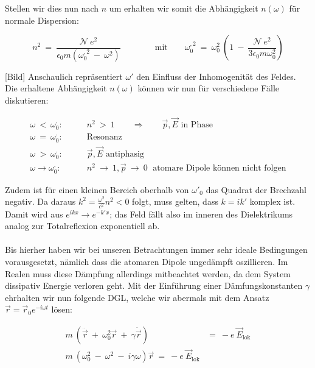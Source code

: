 Stellen wir dies nun nach $n$ um erhalten wir somit die Abhängigkeit $n(\omega)$ für normale Dispersion:

\begin{equation*}
n^2 \ = \ \frac{\mathcal{N} \ e^2}{\epsilon_0 m \left(\omega_0^{,2} \ - \ \omega^2\right)} \qquad \qquad \text{mit} \qquad \omega_0^{,2} \ = \ \omega_0^2\ \left(1 \ - \ \frac{\mathcal{N} \ e^2}{3 \epsilon_0 m \omega_0^2}\right)
\end{equation*}

[Bild]
Anschaulich repräsentiert $\omega'$ den Einfluss der Inhomogenität des Feldes. Die erhaltene Abhängigkeit $n(\omega)$ können wir nun für verschiedene Fälle diskutieren:

\begin{align*}
\omega \ < \ \omega^{,}_0:& \qquad n^2 \ > \ 1 \qquad \Rightarrow\qquad \vec{p},\vec{E} \text{ in Phase}\\
\omega \ = \ \omega^{,}_0:& \qquad \text{Resonanz}\\
\omega \ > \ \omega^{,}_0:& \qquad \vec{p},\vec{E} \text{ antiphasig}\\
\omega \rightarrow \omega^{,}_0:& \qquad n^2 \ \rightarrow \ 1, \vec{p} \ \rightarrow \ 0 \; \text{ atomare Dipole können nicht  folgen}
\end{align*}

Zudem ist für einen kleinen Bereich oberhalb von $\omega'_0$ das Quadrat der Brechzahl negativ. Da daraus $k^2 = \frac{\omega^2}{c^2} n^2 < 0$ folgt, muss gelten, dass $k=ik'$ komplex ist. Damit wird aus $e^{ikx} \rightarrow e^{-k'x}$; das Feld fällt also im inneren des Dielektrikums analog zur Totalreflexion exponentiell ab.\\
\ \\
Bis hierher haben wir bei unseren Betrachtungen immer sehr ideale Bedingungen vorausgesetzt, nämlich dass die atomaren Dipole ungedämpft oszillieren. Im Realen muss diese Dämpfung allerdings mitbeachtet werden, da dem System dissipativ Energie verloren geht. Mit der Einführung einer Dämfungskonstanten $\gamma$ ehrhalten wir nun folgende DGL, welche wir abermals mit dem Ansatz $\vec{r}= \vec{r}_0 e^{-i\omega t}$ lösen:

\begin{align*}
m \ \left(\ddot{\vec{r}} \ + \ \omega_0^2 \vec{r} \ + \ \gamma \dot{\vec{r}}\right)  \ &= \ -e \ \vec{E}_{\text{lok}}\\
m \ \left(\omega_0^2 \ - \ \omega^2 \ - \ i \gamma\omega\right)\vec{r} \ = \ -e \ \vec{E}_{\text{lok}}
\end{align*}

